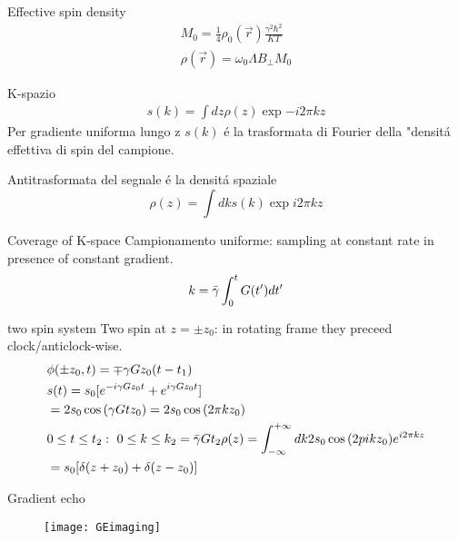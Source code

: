 \begin{wordonframe}{Effective spin density}
\begin{align*}
M_0=\frac{1}{4}\rho_0(\vec{r})\frac{\gamma^2\hbar^2}{KT}\\
\rho(\vec{r})=\omega_0\Lambda B_{\perp}M_0
\end{align*}
\end{wordonframe} 

\begin{frame}{K-spazio}
\begin{align*}
s(k)=\int d z\rho(z)\exp{-i2\pi kz}
\end{align*}
Per gradiente uniforma lungo z $s(k)$ \'e la trasformata di Fourier della "densit\'a effettiva di spin del campione.
\begin{block}{Antitrasformata del segnale \'e la densit\'a spaziale}
\begin{equation*}
\rho(z)=\int d ks(k)\exp{i2\pi kz}
\end{equation*}
\end{block}
\begin{block}{Coverage of K-space}
Campionamento uniforme: sampling at constant rate in presence of constant gradient.
\begin{equation*}
k=\gammabar\int_0^tG(t')d t'
\end{equation*}
\end{block} 
\end{frame}

\begin{frame}{two spin system}
Two spin at $z=\pm z_0$: in rotating frame they preceed clock/anticlock-wise.
\begin{align*}
&\phi(\pm z_0,t)=\mp\gamma Gz_0(t-t_1)\\
&s(t)=s_0[\exp{-i\gamma Gz_0t}+\exp{i\gamma Gz_0t}]\\
&=2s_0\cos{(\gamma G t z_0)}=2s_0\cos{(2\pi kz_0)}\\
&0\leq t\leq t_2:\ 0\leq k\leq k_2=\gammabar Gt_2
\rho(z)=\intsinf{}d k2s_0\cos{(2pi kz_0)}\exp{i2\pi kz}\\
&=s_0[\delta(z+z_0)+\delta(z-z_0)]
\end{align*}

\end{frame}

\begin{frame}{Gradient echo}
\begin{figure}[!ht]\texttt{[image: GEimaging]}\end{figure}

\end{frame}

